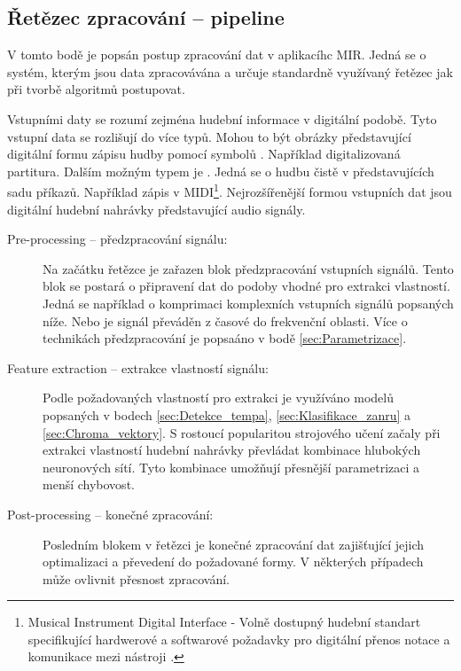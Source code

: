   \subsection{Řetězec zpracování -- pipeline}

    V tomto bodě je popsán postup zpracování dat v aplikacíhc \acs{MIR}.
    Jedná se o systém, kterým jsou data zpracovávána a určuje standardně využívaný řetězec jak při tvorbě algoritmů postupovat.
    
    Vstupními daty se rozumí zejména hudební informace v digitální podobě.
    Tyto vstupní data se rozlišují do více typů. Mohou to být obrázky představující digitální formu zápisu hudby pomocí symbolů \cite{a_new_companion_to_digital_humanities}.
    Například digitalizovaná partitura.
    Dalším možným typem je .
    Jedná se o hudbu čistě v  představujících sadu příkazů.
    Například zápis v \acs{MIDI}\footnote{Musical Instrument Digital Interface -
    Volně dostupný hudební standart specifikující hardwerové a softwarové požadavky pro digitální přenos notace a komunikace mezi nástroji \cite{wiki:MIDI}.}.
    Nejrozšířenější formou vstupních dat jsou digitální hudební nahrávky představující audio signály.

    \begin{description}
      \item[Pre-processing -- předzpracování signálu:] Na začátku řetězce je zařazen blok předzpracování vstupních signálů. Tento blok se postará o připravení dat do podoby vhodné pro extrakci vlastností. Jedná se například o komprimaci komplexních vstupních signálů popsaných níže. Nebo je signál převáděn z časové do frekvenční oblasti. Více o technikách předzpracování je popsaáno v bodě \ref{sec:Parametrizace}.
      \item[Feature extraction -- extrakce vlastností signálu:] Podle požadovaných vlastností pro extrakci je využíváno modelů popsaných v bodech \ref{sec:Detekce_tempa}, \ref{sec:Klasifikace_zanru} a \ref{sec:Chroma_vektory}. S rostoucí popularitou strojového učení začaly při extrakci vlastností hudební nahrávky převládat kombinace hlubokých neuronových sítí. Tyto kombinace umožňují přesnější parametrizaci a menší chybovost.
      \item[Post-processing -- konečné zpracování:] Posledním blokem v řetězci je konečné zpracování dat zajišťující jejich optimalizaci a převedení do požadované formy. V některých případech může ovlivnit přesnost zpracování.
    \end{description}

